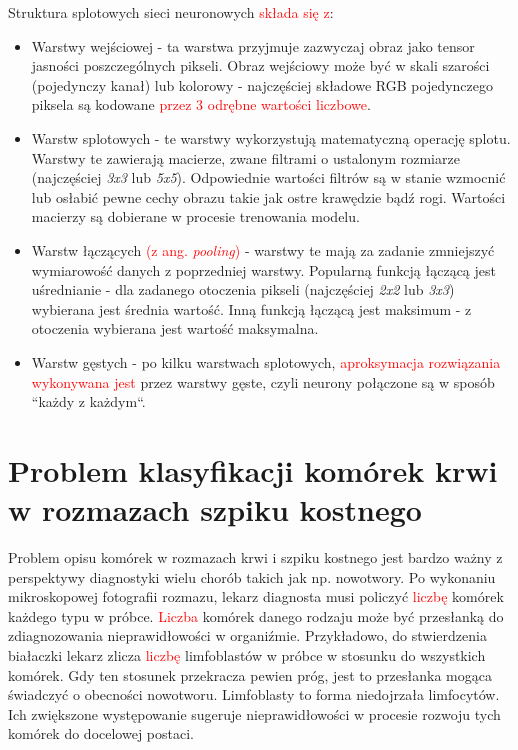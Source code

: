 Struktura splotowych sieci neuronowych \textcolor{red}{składa się z}:
\begin{itemize}
    \item Warstwy wejściowej - ta warstwa przyjmuje zazwyczaj obraz jako tensor jasności poszczególnych pikseli.
    Obraz wejściowy może być w skali szarości (pojedynczy kanał) lub kolorowy - najczęściej składowe RGB pojedynczego piksela są kodowane \textcolor{red}{przez 3 odrębne wartości liczbowe}.
    \item Warstw splotowych - te warstwy wykorzystują matematyczną operację splotu.
    Warstwy te zawierają macierze, zwane filtrami o ustalonym rozmiarze (najczęściej \textit{3x3} lub \textit{5x5}).
    Odpowiednie wartości filtrów są w stanie wzmocnić lub osłabić pewne cechy obrazu takie jak ostre krawędzie bądź rogi.
    Wartości macierzy są dobierane w procesie trenowania modelu.
    \item Warstw łączących \textcolor{red}{(z ang. \textit{pooling})} - warstwy te mają za zadanie zmniejszyć wymiarowość danych z poprzedniej warstwy.
    Popularną funkcją łączącą jest uśrednianie - dla zadanego otoczenia pikseli (najczęściej \textit{2x2} lub \textit{3x3}) wybierana jest średnia wartość.
    Inną funkcją łączącą jest maksimum - z otoczenia wybierana jest wartość maksymalna.
    \item Warstw gęstych - po kilku warstwach splotowych, \textcolor{red}{aproksymacja rozwiązania wykonywana jest} przez warstwy gęste, czyli neurony połączone są w sposób “każdy z każdym“.
\end{itemize}


\section{Problem klasyfikacji komórek krwi w rozmazach szpiku kostnego}

Problem opisu komórek w rozmazach krwi i szpiku kostnego jest bardzo ważny z perspektywy diagnostyki wielu chorób takich jak np.
nowotwory.
Po wykonaniu mikroskopowej fotografii rozmazu, lekarz diagnosta musi policzyć \textcolor{red}{liczbę} komórek każdego typu w próbce.
\textcolor{red}{Liczba} komórek danego rodzaju może być przesłanką do zdiagnozowania nieprawidłowości w organiźmie.
Przykładowo, do stwierdzenia białaczki lekarz zlicza \textcolor{red}{liczbę} limfoblastów w próbce w stosunku do wszystkich komórek.
Gdy ten stosunek przekracza pewien próg, jest to przesłanka mogąca świadczyć o obecności nowotworu.
Limfoblasty to forma niedojrzała limfocytów.
Ich zwiększone występowanie sugeruje nieprawidłowości w procesie rozwoju tych komórek do docelowej postaci.

